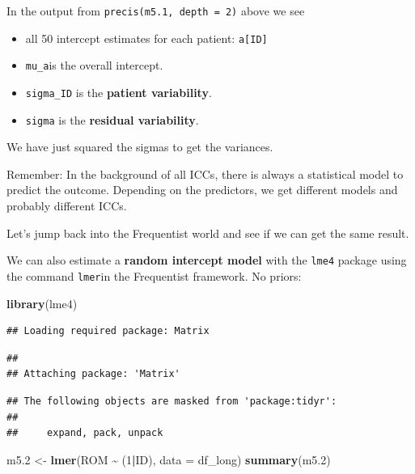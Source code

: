 \documentclass[
]{article}
\newenvironment{Shaded}{\begin{snugshade}}{\end{snugshade}}
\newcommand{\AttributeTok}[1]{\textcolor[rgb]{0.13,0.29,0.53}{#1}}
\newcommand{\DecValTok}[1]{\textcolor[rgb]{0.00,0.00,0.81}{#1}}
\newcommand{\FloatTok}[1]{\textcolor[rgb]{0.00,0.00,0.81}{#1}}
\newcommand{\FunctionTok}[1]{\textcolor[rgb]{0.13,0.29,0.53}{\textbf{#1}}}
\newcommand{\NormalTok}[1]{#1}
\newcommand{\OtherTok}[1]{\textcolor[rgb]{0.56,0.35,0.01}{#1}}
\newcommand{\SpecialCharTok}[1]{\textcolor[rgb]{0.81,0.36,0.00}{\textbf{#1}}}
\providecommand{\tightlist}{%
  \setlength{\itemsep}{0pt}\setlength{\parskip}{0pt}}
\begin{document}
In the output from \texttt{precis(m5.1,\ depth\ =\ 2)} above we see

\begin{itemize}
\tightlist
\item
  all 50 intercept estimates for each patient: \texttt{a{[}ID{]}}
\item
  \texttt{mu\_a}is the overall intercept.
\item
  \texttt{sigma\_ID} is the \textbf{patient variability}.
\item
  \texttt{sigma} is the \textbf{residual variability}.
\end{itemize}

We have just squared the sigmas to get the variances.

Remember: In the background of all ICCs, there is always a statistical model to predict
the outcome. Depending on the predictors, we get different models and
probably different ICCs.

Let's jump back into the Frequentist world and see if we can get the same result.

We can also estimate a \textbf{random intercept model} with the \texttt{lme4} package using
the command \texttt{lmer}in the Frequentist framework. No priors:

\begin{Shaded}
\begin{Highlighting}[]
\FunctionTok{library}\NormalTok{(lme4)}
\end{Highlighting}
\end{Shaded}

\begin{verbatim}
## Loading required package: Matrix
\end{verbatim}

\begin{verbatim}
## 
## Attaching package: 'Matrix'
\end{verbatim}

\begin{verbatim}
## The following objects are masked from 'package:tidyr':
## 
##     expand, pack, unpack
\end{verbatim}

\begin{Shaded}
\begin{Highlighting}[]
\NormalTok{m5}\FloatTok{.2} \OtherTok{\textless{}{-}} \FunctionTok{lmer}\NormalTok{(ROM }\SpecialCharTok{\textasciitilde{}}\NormalTok{ (}\DecValTok{1}\SpecialCharTok{|}\NormalTok{ID), }\AttributeTok{data =}\NormalTok{ df\_long)}
\FunctionTok{summary}\NormalTok{(m5}\FloatTok{.2}\NormalTok{)}
\end{Highlighting}
\end{Shaded}
\end{document}
